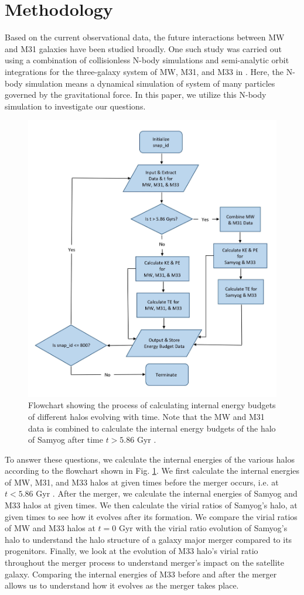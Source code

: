 \documentclass[twocolumn]{aastex631}
\begin{document}
\section{Methodology}
\label{sec:method}

Based on the current observational data, the future interactions between MW and M31 galaxies have been studied broadly. One such study was carried out using a combination of collisionless N-body simulations and semi-analytic orbit integrations for the three-galaxy system of MW, M31, and M33 in \cite{simulation}. Here, the N-body simulation means a dynamical simulation of system of many particles governed by the gravitational force. In this paper, we utilize this N-body simulation to investigate our questions. 

\begin{figure}[htbp]
\includegraphics[width=.5\textwidth]{flowchart.jpg}
\caption{Flowchart showing the process of calculating internal energy budgets of different halos evolving with time. Note that the MW and M31 data is combined to calculate the internal energy budgets of the halo of Samyog after time $t > 5.86$ Gyr \citep{simulation}.
\label{fig:flowchart}}
\end{figure}

To answer these questions, we calculate the internal energies of the various halos according to the flowchart shown in Fig. \ref{fig:flowchart}. We first calculate the internal energies of MW, M31, and M33 halos at given times before the merger occurs, i.e. at $t < 5.86$ Gyr \citep[see][]{simulation}. After the merger, we calculate the internal energies of Samyog and M33 halos at given times. We then calculate the virial ratios of Samyog's halo, at given times to see how it evolves after its formation. We compare the virial ratios of MW and M33 halos at $t=0$ Gyr with the virial ratio evolution of Samyog's halo to understand the halo structure of a galaxy major merger compared to its progenitors. Finally, we look at the evolution of M33 halo's virial ratio throughout the merger process to understand merger's impact on the satellite galaxy. Comparing the internal energies of M33 before and after the merger allows us to understand how it evolves as the merger takes place.
\end{document}
